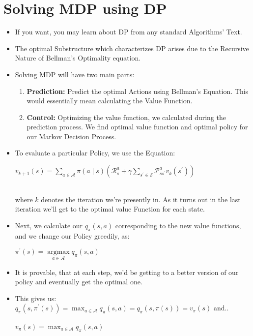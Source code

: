 \documentclass{article}
\begin{document}
\section{Solving MDP using DP}

\begin{itemize}
  \item If you want, you may learn about DP from any standard Algorithms' Text.
  \item The optimal Substructure which characterizes DP arises due to the Recursive Nature of Bellman's Optimality equation.
  \item Solving MDP will have two main parts:
  \begin{enumerate}
    \item \textbf{Prediction:} Predict the optimal Actions using Bellman's Equation. This would essentially mean calculating the Value Function.
    \item \textbf{Control:} Optimizing the value function, we calculated during the prediction process. We find optimal value function and optimal policy for our Markov Decision Process.
  \end{enumerate}
  \item To evaluate a particular Policy, we use the Equation: \\
  \begin{center}
    \( v_{k+1}(s)=\sum_{a \in \mathcal{A}} \pi(a \mid s)\left(\mathcal{R}_{s}^{a}+\gamma \sum_{s^{\prime} \in \mathcal{S}} \mathcal{P}_{s s^{\prime}}^{a} v_{k}\left(s^{\prime}\right)\right) \) \\~\\
  \end{center}
  where $k$ denotes the iteration we're presently in. As it turns out in the last iteration we'll get to the optimal value Function for each state.
  \item Next, we calculate our $q_{\pi} (s,a)$ corresponding to the new value functions, and we change our Policy greedily, as:
  \begin{center}
  \( \pi^{\prime}(s)=\underset{a \in \mathcal{A}}{\operatorname{argmax}} q_{\pi}(s, a) \)
  \end{center}
  \item It is provable, that at each step, we'd be getting to a better version of our policy and eventually get the optimal one.
  \item This gives us:  \\ \( q_{\pi}\left(s, \pi^{\prime}(s)\right)=\max _{a \in \mathcal{A}} q_{\pi}(s, a)=q_{\pi}(s, \pi(s))=v_{\pi}(s) \) and.. \\~\\
  \( v_{\pi}(s)=\max _{a \in \mathcal{A}} q_{\pi}(s, a) \)


\end{itemize}
\end{document}
